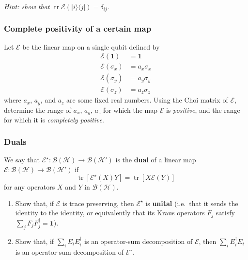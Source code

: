\documentclass[fleqn]{article}
\providecommand{\tightlist}{%
  \setlength{\itemsep}{0pt}\setlength{\parskip}{0pt}}
\begin{document}
\emph{Hint: show that \(\operatorname{tr}\mathcal{E}(|i\rangle\langle j|)=\delta_{ij}\).}

\hypertarget{complete-positivity-of-a-certain-map}{%
\subsubsection{Complete positivity of a certain map}\label{complete-positivity-of-a-certain-map}}

Let \(\mathcal{E}\) be the linear map on a single qubit defined by
\[
  \begin{aligned}
    \mathcal{E}(\mathbf{1})
    &= \mathbf{1}
  \\\mathcal{E}(\sigma_x)
    &= a_x\sigma_x
  \\\mathcal{E}(\sigma_y)
    &= a_y\sigma_y
  \\\mathcal{E}(\sigma_z)
    &= a_z\sigma_z
  \end{aligned}
\]
where \(a_x\), \(a_y\), and \(a_z\) are some fixed real numbers.
Using the Choi matrix of \(\mathcal{E}\), determine the range of \(a_x\), \(a_y\), \(a_z\) for which the map \(\mathcal{E}\) is \emph{positive}, and the range for which it is \emph{completely positive}.

\hypertarget{duals}{%
\subsubsection{Duals}\label{duals}}

We say that \(\mathcal{E}^\star\colon\mathcal{B}(\mathcal{H})\to\mathcal{B}(\mathcal{H}')\) is the \textbf{dual} of a linear map \(\mathcal{E}\colon\mathcal{B}(\mathcal{H})\to\mathcal{B}(\mathcal{H}')\) if
\[
  \operatorname{tr}[\mathcal{E}^\star (X)Y] = \operatorname{tr}[X\mathcal{E}(Y)]
\]
for any operators \(X\) and \(Y\) in \(\mathcal{B}(\mathcal{H})\).

\begin{enumerate}
\def\labelenumi{\arabic{enumi}.}
\tightlist
\item
  Show that, if \(\mathcal{E}\) is trace preserving, then \(\mathcal{E}^\star\) is \textbf{unital} (i.e.~that it sends the identity to the identity, or equivalently that its Kraus operators \(F_j\) satisfy \(\sum_j F_jF_j^\dagger=\mathbf{1}\)).
\item
  Show that, if \(\sum_i E_i E_i^\dagger\) is an operator-sum decomposition of \(\mathcal{E}\), then \(\sum_i E^\dagger_i E_i\) is an operator-sum decomposition of \(\mathcal{E}^\star\).
\end{enumerate}
\end{document}
